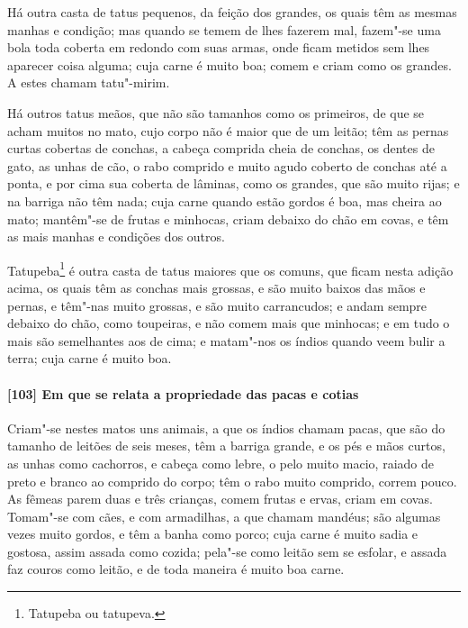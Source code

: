 \begin{linenumbers}
Há outra casta de tatus pequenos, da feição dos grandes, os quais têm as mesmas manhas e
condição; mas quando se temem de lhes fazerem mal, fazem"-se uma bola toda coberta em
redondo com suas armas, onde ficam metidos sem lhes aparecer coisa alguma; cuja carne é
muito boa; comem e criam como os grandes. A estes chamam tatu"-mirim.

Há outros tatus meãos, que não são tamanhos como os primeiros, de que se acham muitos no
mato, cujo corpo não é maior que de um leitão; têm as pernas curtas cobertas de conchas, a
cabeça comprida cheia de conchas, os dentes de gato, as unhas de cão, o rabo comprido e
muito agudo coberto de conchas até a ponta, e por cima sua coberta de lâminas, como os
grandes, que são muito rijas; e na barriga não têm nada; cuja carne quando estão gordos é
boa, mas cheira ao mato; mantêm"-se de frutas e minhocas, criam debaixo do chão em covas, e
têm as mais manhas e condições dos outros.

Tatupeba\footnote{ Tatupeba ou tatupeva.} é outra casta de tatus maiores que os comuns,
que ficam nesta adição acima, os quais têm as conchas mais grossas, e são muito baixos das
mãos e pernas, e têm"-nas muito grossas, e são muito carrancudos; e andam sempre debaixo do
chão, como toupeiras, e não comem mais que minhocas; e em tudo o mais são semelhantes aos
de cima; e matam"-nos os índios quando veem bulir a terra; cuja carne é muito boa.

\paragraph{[103] Em que se relata a propriedade das pacas e cotias}\quad
Criam"-se nestes matos uns animais, a que os índios chamam pacas, que são do tamanho de
leitões de seis meses, têm a barriga grande, e os pés e mãos curtos, as unhas como
cachorros, e cabeça como lebre, o pelo muito macio, raiado de preto e branco ao comprido
do corpo; têm o rabo muito comprido, correm pouco. As fêmeas parem duas e três crianças,
comem frutas e ervas, criam em covas. Tomam"-se com cães, e com armadilhas, a que chamam
mandéus; são algumas vezes muito gordos, e têm a banha como porco; cuja carne é muito
sadia e gostosa, assim assada como cozida; pela"-se como leitão sem se esfolar, e assada
faz couros como leitão, e de toda maneira é muito boa carne.


\end{linenumbers}
